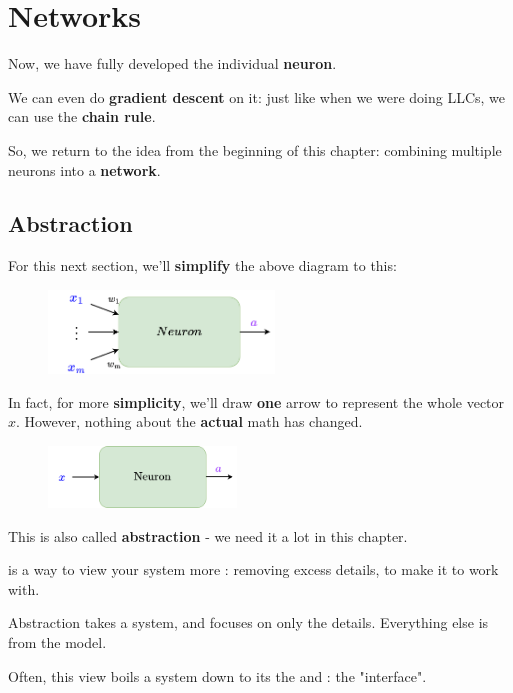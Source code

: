 \section*{Networks}

    Now, we have fully developed the individual \textbf{neuron}. 
    
    We can even do \textbf{gradient descent} on it: just like when we were doing LLCs, we can use the \textbf{chain rule}. 
        
    So, we return to the idea from the beginning of this chapter: combining multiple neurons into a \textbf{network}. 
    
    \subsection*{Abstraction}
        For this next section, we'll \textbf{simplify} the above diagram to this:
        
        \begin{figure}[H]
            \centering
            \includegraphics[width=60mm,scale=0.4]{images/nn_images/neuron_abstraction.png}
        \end{figure}
        
        In fact, for more \textbf{simplicity}, we'll draw \textbf{one} arrow to represent the whole vector $x$. However, nothing about the \textbf{actual} math has changed.
        
        \begin{figure}[H]
            \centering
            \includegraphics[width=50mm,scale=0.4]{images/nn_images/neuron_abstraction_x.png}
        \end{figure}
        
        This is also called \textbf{abstraction} - we need it a lot in this chapter.\\
        
        \begin{definition}
             is a way to view your system more : removing excess details, to make it  to work with.
            
            Abstraction takes a  system, and focuses on only the  details. Everything else is  from the model.
            
            Often, this  view boils a system down to its the  and : the "interface".
        \end{definition}
        
